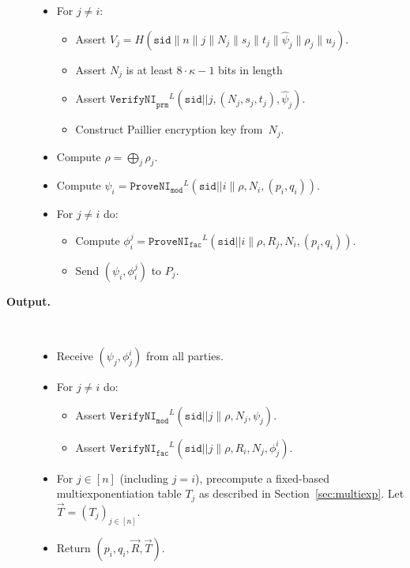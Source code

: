 \documentclass[11pt]{article}
\newcommand{\sid}{\ensuremath{\mathtt{sid}}}
\newcommand{\proveni}[1]{\ensuremath{\mathtt{ProveNI}_{\mathtt{#1}}}}
\newcommand{\verifyni}[1]{\ensuremath{\mathtt{VerifyNI}_{\mathtt{#1}}}}
\newcommand{\?}[1]{\stackrel{?}{#1}}
\begin{document}
\begin{description}
\begin{itemize}
      \item For $j \neq i$:
        \begin{itemize}
          \item Assert $V_j =
            H(\sid\| n\| j\| N_j\| s_j\| t_j\| \hat{\psi}_j\| \rho_j\|u_j)$.
          \item Assert $N_j$ is at least $8 \cdot \kappa - 1$ bits in length
          \item Assert $\verifyni{prm}^L(\sid||j, (N_j, s_j, t_j), \hat{\psi}_j)$.
          \item Construct Paillier encryption key from~$N_j$.
        \end{itemize}
\item Compute $\rho=\bigoplus_j \rho_j$.
      \item Compute $\psi_i = \proveni{mod}^L(\sid||i\|\rho, N_i, (p_i, q_i))$.
      \item For $j\neq i$ do:
        \begin{itemize}
          \item Compute $\phi_i^j = \proveni{fac}^{L}(\sid||i\|\rho, R_j, N_i, (p_i, q_i))$.
          \item Send $(\psi_i, \phi_i^j)$ to $P_j$.
        \end{itemize}

    \end{itemize}

  \item[\textbf{Output.}] \

    \begin{itemize}
      \item Receive $(\psi_j, \phi_j^i)$ from all parties.
      \item For $j \neq i$ do: 
        \begin{itemize}
          \item Assert $\verifyni{mod}^L(\sid||j\|\rho, N_j, \psi_j)$.
          \item Assert $\verifyni{fac}^{L}(\sid||j\|\rho, R_i, N_j, \phi_j^i)$.
        \end{itemize}

      \item For $j \in [n]$ (including $j=i$), precompute a fixed-based multiexponentiation table $T_j$ as described in Section~\ref{sec:multiexp}. Let $\vec{T} = (T_j)_{j \in [n]}$.
      \item Return $(p_i, q_i, \vec{R}, \vec{T})$.
    \end{itemize}

\end{description}
\end{document}
